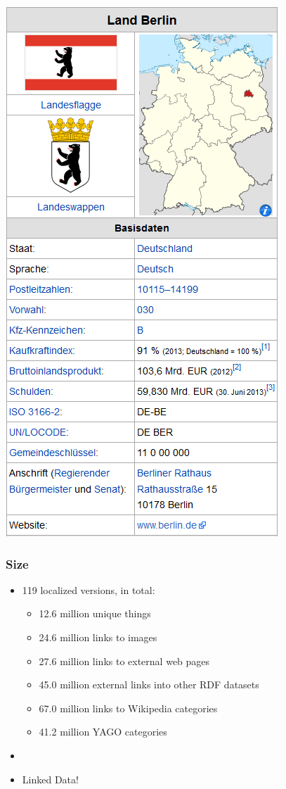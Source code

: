 \begin{frame}
\begin{minipage}{0.25\textwidth}
\includegraphics[scale=0.25]{img/berlin_infobox.png}
\end{minipage}
\end{frame}

\begin{frame}
\frametitle{Size}
\begin{itemize}
  \item 119 localized versions, in total:
  \begin{itemize}
    \item  12.6 million unique things
    \item 24.6 million links to images
    \item 27.6 million links to external web
    pages
    \item 45.0 million external links into other RDF datasets
    \item 67.0 million links to Wikipedia categories
    \item 41.2 million YAGO categories
  \end{itemize}
  \item[]
  \item Linked Data!
\end{itemize}
\end{frame}

